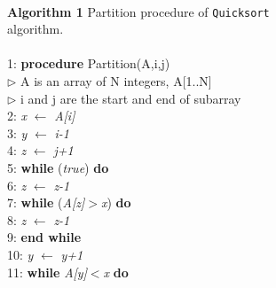 \documentclass{article}
\begin{document}
\begin{multicols}{2}
\noindent\makebox[\linewidth]{\rule{0.5\textwidth}{1.2pt}}\\
\noindent\textbf{Algorithm 1} Partition procedure of \texttt{Quicksort}\\algorithm.\\
\noindent\makebox[\linewidth]{\rule{0.5\textwidth}{0.4pt}}\\
\hspace{1ex} 1: \textbf{procedure} Partition(A,i,j)\\
\phantom{x}\hspace{1ex} $\triangleright$ A is an array of N integers, A[1..N]\\
\phantom{x}\hspace{1ex} $\triangleright$ i and j are the start and end of subarray\\
2: \hspace{4ex} \textit{x} $\leftarrow$ \textit{A[i]}\\
3: \hspace{4ex} \textit{y} $\leftarrow$ \textit{i-1}\\
4: \hspace{4ex} \textit{z} $\leftarrow$ \textit{j+1}\\
5: \hspace{4ex} \textbf{while} (\textit{true}) \textbf{do}\\
6: \hspace{4ex} \hspace{4ex} \textit{z} $\leftarrow$ \textit{z-1}\\
7: \hspace{4ex} \hspace{4ex} \textbf{while} (\textit{A[\textit{z}]$>$\textit{x}}) \textbf{do}\\
8: \hspace{4ex} \hspace{4ex} \hspace{4ex} \textit{z} $\leftarrow$ \textit{z-1}\\
\hspace{1ex} 9: \hspace{4ex} \hspace{4ex} \textbf{end while}\\
10:\hspace{4ex} \hspace{4ex} \textit{y} $\leftarrow$ \textit{y+1}\\
11:\hspace{4ex} \hspace{4ex} \textbf{while} \textit{A[y]$<$x} \textbf{do}\\

\end{multicols}
\end{document}
